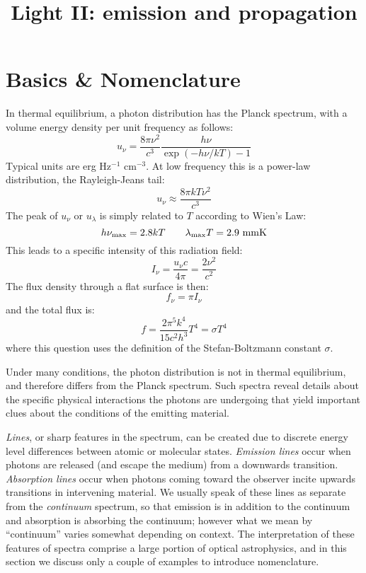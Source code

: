 \title{\bf Light II: emission and propagation}

\section{Basics \& Nomenclature}

In thermal equilibrium, a photon distribution has the Planck spectrum,
with a volume energy density per unit frequency as follows:
\begin{equation}
u_\nu = \frac{8\pi \nu^2}{c^3} \frac{h\nu}{\exp(-h\nu/kT)-1} 
\end{equation}
Typical units are erg Hz$^{-1}$ cm$^{-3}$. At low frequency this is a
power-law distribution, the Rayleigh-Jeans tail:
\begin{equation}
u_\nu \approx  \frac{8\pi k T \nu^2 }{c^3}
\end{equation}
The peak of $u_\nu$ or $u_\lambda$ is simply related to $T$ according
to Wien's Law:
\begin{equation}
\label{eq:wiens}
h\nu_{\rm max} = 2.8 kT \quad\quad
\lambda_{\rm max} T = 2.9 {\rm ~mm} {\rm K} 
\end{equation}
This leads to a specific intensity of this radiation field:
\begin{equation}
I_\nu = \frac{u_\nu c}{4\pi} = \frac{2\nu^2}{c^2}
\end{equation}
The flux density through a flat surface is then:
\begin{equation}
f_\nu = \pi I_\nu 
\end{equation}
and the total flux is:
\begin{equation}
f = \frac{2\pi^5 k^4}{15 c^2 h^3} T^4 = \sigma T^4
\end{equation}
where this question uses the definition of the Stefan-Boltzmann
constant $\sigma$.

Under many conditions, the photon distribution is not in thermal
equilibrium, and therefore differs from the Planck spectrum. Such
spectra reveal details about the specific physical interactions the
photons are undergoing that yield important clues about the conditions
of the emitting material.

{\it Lines}, or sharp features in the spectrum, can be created due to
discrete energy level differences between atomic or molecular
states. {\it Emission lines} occur when photons are released (and
escape the medium) from a downwards transition. {\it Absorption lines}
occur when photons coming toward the observer incite upwards
transitions in intervening material. We usually speak of these lines
as separate from the {\it continuum} spectrum, so that emission is in
addition to the continuum and absorption is absorbing the continuum;
however what we mean by ``continuum'' varies somewhat depending on
context.  The interpretation of these features of spectra comprise a
large portion of optical astrophysics, and in this section we discuss
only a couple of examples to introduce nomenclature.

